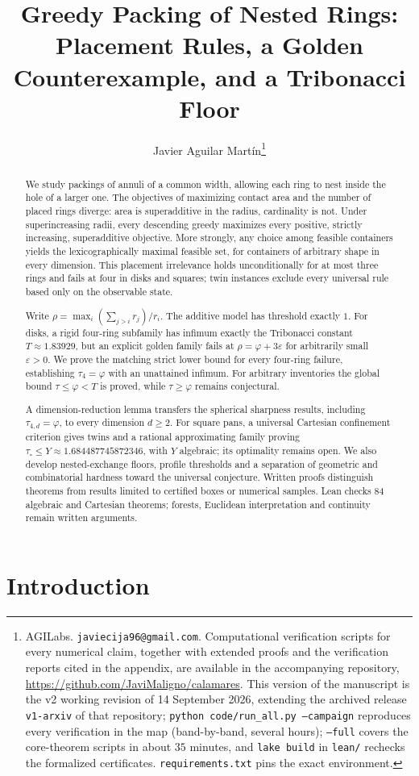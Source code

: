 \documentclass[11pt]{article}
\title{Greedy Packing of Nested Rings:\\ Placement Rules, a Golden
Counterexample, and a Tribonacci Floor}
\author{Javier Aguilar Mart\'in\thanks{AGILabs.
\texttt{javiecija96@gmail.com}. Computational verification scripts for
every numerical claim, together with extended proofs and the verification
reports cited in the appendix, are available in the accompanying repository,
\url{https://github.com/JaviMaligno/calamares}. This version of the
manuscript is the v2 working revision of 14 September 2026, extending
the archived release \texttt{v1-arxiv} of that repository;
\texttt{python code/run\_all.py --campaign} reproduces every
verification in the map (band-by-band, several hours);
\texttt{--full} covers the core-theorem scripts in about $35$
minutes, and \texttt{lake build} in \texttt{lean/} rechecks the
formalized certificates. \texttt{requirements.txt} pins the exact
environment.}}
\date{}
\theoremstyle{definition}
\begin{document}
\maketitle

\begin{abstract}
We study packings of annuli of a common width, allowing each ring to
nest inside the hole of a larger one. The objectives of maximizing
contact area and the number of placed rings diverge: area is
superadditive in the radius, cardinality is not. Under superincreasing
radii, every descending greedy maximizes every positive, strictly
increasing, superadditive objective. More strongly, any choice among
feasible containers yields the lexicographically maximal feasible set,
for containers of arbitrary shape in every dimension. This placement
irrelevance holds unconditionally for at most three rings and fails
at four in disks and squares; twin instances exclude every universal
rule based only on the observable state.

Write $\rho=\max_i(\sum_{j>i}r_j)/r_i$. The additive model has
threshold exactly $1$. For disks, a rigid four-ring subfamily has
infimum exactly the Tribonacci constant $T\approx1.83929$, but an
explicit golden family fails at $\rho=\varphi+3\varepsilon$ for
arbitrarily small $\varepsilon>0$. We prove the matching strict
lower bound for every four-ring failure, establishing
$\tau_4=\varphi$ with an unattained infimum. For arbitrary inventories
the global bound $\tau\le\varphi<T$ is proved, while
$\tau\ge\varphi$ remains conjectural.

A dimension-reduction lemma transfers the spherical sharpness results,
including $\tau_{4,d}=\varphi$, to every dimension $d\ge2$.
For square pans, a universal Cartesian confinement criterion gives
twins and a rational approximating family proving
$\tau_{\square}\le Y\approx1.684487745872346$, with $Y$ algebraic;
its optimality remains open. We also develop nested-exchange floors,
profile thresholds and a separation of geometric and combinatorial
hardness toward the universal conjecture. Written proofs distinguish
theorems from results limited to certified boxes or numerical samples.
Lean checks 84 algebraic and Cartesian theorems; forests, Euclidean
interpretation and continuity remain written arguments.
\end{abstract}

\section{Introduction}
\end{document}
